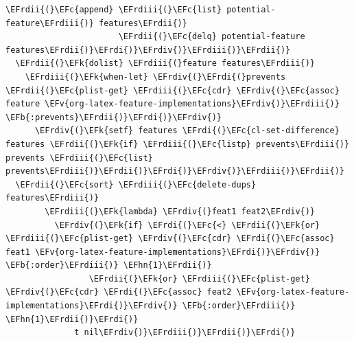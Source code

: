 \documentclass{scrartcl}
\newcommand{\EFk}[1]{\textcolor{EFk}{#1}} %
\newcommand{\EFb}[1]{\textcolor{EFb}{#1}} %
\newcommand{\EFc}[1]{\textcolor{EFc}{#1}} %
\newcommand{\EFv}[1]{\textcolor{EFv}{#1}} %
\newcommand{\EFhn}[1]{#1} %
\newcommand{\EFrdi}[1]{#1} %
\newcommand{\EFrdii}[1]{#1} %
\newcommand{\EFrdiii}[1]{#1} %
\newcommand{\EFrdiv}[1]{#1} %
\begin{document}
\begin{Code}
\begin{Verbatim}[]
                         \EFrdii{(}\EFc{append} \EFrdiii{(}\EFc{list} potential-feature\EFrdiii{)} features\EFrdii{)}
                       \EFrdii{(}\EFc{delq} potential-feature features\EFrdii{)}\EFrdi{)}\EFrdiv{)}\EFrdiii{)}\EFrdii{)}
  \EFrdii{(}\EFk{dolist} \EFrdiii{(}feature features\EFrdiii{)}
    \EFrdiii{(}\EFk{when-let} \EFrdiv{(}\EFrdi{(}prevents \EFrdii{(}\EFc{plist-get} \EFrdiii{(}\EFc{cdr} \EFrdiv{(}\EFc{assoc} feature \EFv{org-latex-feature-implementations}\EFrdiv{)}\EFrdiii{)} \EFb{:prevents}\EFrdii{)}\EFrdi{)}\EFrdiv{)}
      \EFrdiv{(}\EFk{setf} features \EFrdi{(}\EFc{cl-set-difference} features \EFrdii{(}\EFk{if} \EFrdiii{(}\EFc{listp} prevents\EFrdiii{)} prevents \EFrdiii{(}\EFc{list} prevents\EFrdiii{)}\EFrdii{)}\EFrdi{)}\EFrdiv{)}\EFrdiii{)}\EFrdii{)}
  \EFrdii{(}\EFc{sort} \EFrdiii{(}\EFc{delete-dups} features\EFrdiii{)}
        \EFrdiii{(}\EFk{lambda} \EFrdiv{(}feat1 feat2\EFrdiv{)}
          \EFrdiv{(}\EFk{if} \EFrdi{(}\EFc{<} \EFrdii{(}\EFk{or} \EFrdiii{(}\EFc{plist-get} \EFrdiv{(}\EFc{cdr} \EFrdi{(}\EFc{assoc} feat1 \EFv{org-latex-feature-implementations}\EFrdi{)}\EFrdiv{)} \EFb{:order}\EFrdiii{)} \EFhn{1}\EFrdii{)}
                 \EFrdii{(}\EFk{or} \EFrdiii{(}\EFc{plist-get} \EFrdiv{(}\EFc{cdr} \EFrdi{(}\EFc{assoc} feat2 \EFv{org-latex-feature-implementations}\EFrdi{)}\EFrdiv{)} \EFb{:order}\EFrdiii{)} \EFhn{1}\EFrdii{)}\EFrdi{)}
              t nil\EFrdiv{)}\EFrdiii{)}\EFrdii{)}\EFrdi{)}
\end{Verbatim}
\end{Code}
\end{document}

